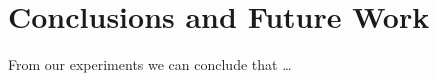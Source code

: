 \section{Conclusions and Future Work}

From our experiments we can conclude that \ldots

\pagebreak

